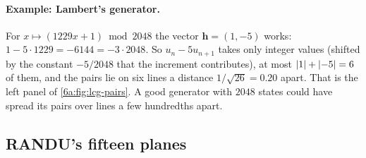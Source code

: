 \paragraph{Example: Lambert's generator.}
For $x\mapsto(1229x+1)\bmod2048$ the vector $\bm h=(1,-5)$ works:
$1-5\cdot1229=-6144=-3\cdot2048$. So $u_n-5u_{n+1}$ takes only integer values
(shifted by the constant $-5/2048$ that the increment contributes), at most
$\left\lvert 1\right\rvert+\left\lvert -5\right\rvert=6$ of them, and the pairs lie on six lines a distance
$1/\sqrt{26}=0.20$ apart. That is the left panel of \cref{6a:fig:lcg-pairs}. A good
generator with $2048$ states could have spread its pairs over lines a few
hundredths apart.

\subsection{RANDU's fifteen planes}

